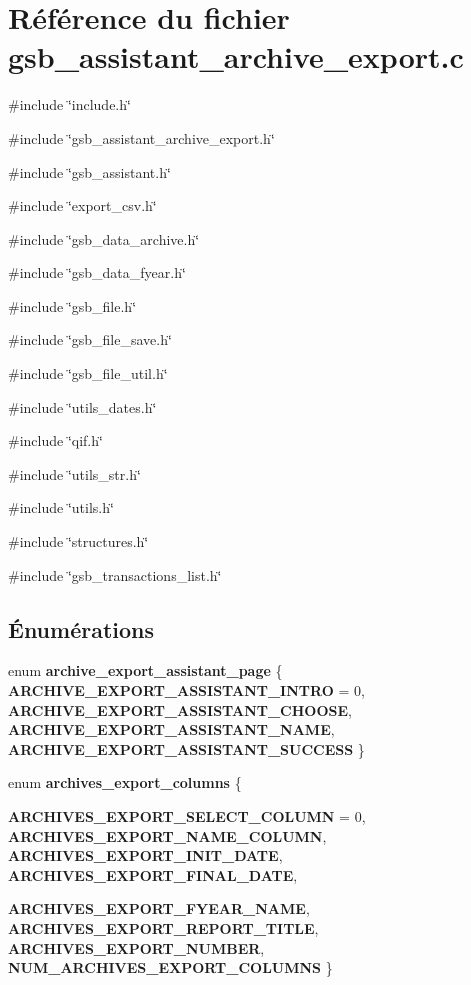 \section{Référence du fichier gsb\_\-assistant\_\-archive\_\-export.c}
\label{gsb__assistant__archive__export_8c}
{\ttfamily \#include \char`\"{}include.h\char`\"{}}\par
{\ttfamily \#include \char`\"{}gsb\_\-assistant\_\-archive\_\-export.h\char`\"{}}\par
{\ttfamily \#include \char`\"{}gsb\_\-assistant.h\char`\"{}}\par
{\ttfamily \#include \char`\"{}export\_\-csv.h\char`\"{}}\par
{\ttfamily \#include \char`\"{}gsb\_\-data\_\-archive.h\char`\"{}}\par
{\ttfamily \#include \char`\"{}gsb\_\-data\_\-fyear.h\char`\"{}}\par
{\ttfamily \#include \char`\"{}gsb\_\-file.h\char`\"{}}\par
{\ttfamily \#include \char`\"{}gsb\_\-file\_\-save.h\char`\"{}}\par
{\ttfamily \#include \char`\"{}gsb\_\-file\_\-util.h\char`\"{}}\par
{\ttfamily \#include \char`\"{}utils\_\-dates.h\char`\"{}}\par
{\ttfamily \#include \char`\"{}qif.h\char`\"{}}\par
{\ttfamily \#include \char`\"{}utils\_\-str.h\char`\"{}}\par
{\ttfamily \#include \char`\"{}utils.h\char`\"{}}\par
{\ttfamily \#include \char`\"{}structures.h\char`\"{}}\par
{\ttfamily \#include \char`\"{}gsb\_\-transactions\_\-list.h\char`\"{}}\par
\subsection*{Énumérations}
\begin{DoxyCompactItemize}
\item 
enum {\bf archive\_\-export\_\-assistant\_\-page} \{ {\bf ARCHIVE\_\-EXPORT\_\-ASSISTANT\_\-INTRO} =  0, 
{\bf ARCHIVE\_\-EXPORT\_\-ASSISTANT\_\-CHOOSE}, 
{\bf ARCHIVE\_\-EXPORT\_\-ASSISTANT\_\-NAME}, 
{\bf ARCHIVE\_\-EXPORT\_\-ASSISTANT\_\-SUCCESS}
 \}
\item 
enum {\bf archives\_\-export\_\-columns} \{ \par
{\bf ARCHIVES\_\-EXPORT\_\-SELECT\_\-COLUMN} =  0, 
{\bf ARCHIVES\_\-EXPORT\_\-NAME\_\-COLUMN}, 
{\bf ARCHIVES\_\-EXPORT\_\-INIT\_\-DATE}, 
{\bf ARCHIVES\_\-EXPORT\_\-FINAL\_\-DATE}, 
\par
{\bf ARCHIVES\_\-EXPORT\_\-FYEAR\_\-NAME}, 
{\bf ARCHIVES\_\-EXPORT\_\-REPORT\_\-TITLE}, 
{\bf ARCHIVES\_\-EXPORT\_\-NUMBER}, 
{\bf NUM\_\-ARCHIVES\_\-EXPORT\_\-COLUMNS}
 \}
\end{DoxyCompactItemize}
